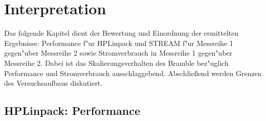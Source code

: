 \chapter{Interpretation}\label{Kap4}

Das folgende Kapitel dient der Bewertung und Einordnung der ermittelten Ergebnisse: Performance f"ur HPLinpack und STREAM f"ur Messreihe 1 gegen"uber Messreihe 2 sowie Stromverbrauch in Messreihe 1 gegen"uber Messreihe 2. Dabei ist das Skalierungsverhalten des Bramble bez"uglich Performance und Stromverbrauch ausschlaggebend. Abschlie\ss end werden Grenzen des Versuchsaufbaus diskutiert.   

\section{HPLinpack: Performance}\label{Interpretation-Linpack}


